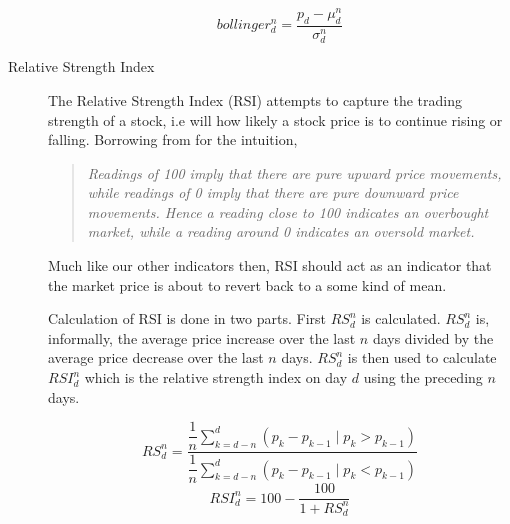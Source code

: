 \documentclass{report}
\begin{document}
\begin{description}
  \begin{figure}[H]
  \begin{center}
      \begin{equation}
        bollinger^{n}_{d} = \dfrac{p_{d} - \mu^{n}_{d}} {\sigma^{n}_{d}}
        \label{eq:bol-calc}
      \end{equation}
  \end{center}
  \end{figure}  
  
  \item[Relative Strength Index] 
  The Relative Strength Index (RSI) attempts to capture the trading strength of a stock, i.e will how likely a stock price is to continue rising or falling. Borrowing from \citet{wong2003rewarding} for the intuition,
  
  \begin{quotation}
  \textit{Readings of 100 imply that there are pure upward price movements, while readings of 0 imply that there are pure downward price movements. Hence a reading close to 100 indicates an overbought market, while a reading around 0 indicates an oversold market.}
  \end{quotation} 
  
  Much like our other indicators then, RSI should act as an indicator that the market price is about to revert back to a some kind of mean.
  
  Calculation of RSI is done in two parts. First $RS^{n}_{d}$ is calculated. $RS^{n}_{d}$ is, informally, the average price increase over the last $n$ days divided by the average price decrease over the last $n$ days. $RS^{n}_{d}$ is then used to calculate $RSI^{n}_{d}$ which is the relative strength index on day $d$ using the preceding $n$ days.
  
  \begin{figure}[H]
  \begin{center}
      \begin{equation}
        RS^{n}_{d} = \dfrac 
        {\dfrac {1} {n} \sum\limits_{k=d-n}^{d} ( p_{k} - p_{k-1} \mid p_{k} > p_{k-1})} 
        {\dfrac {1} {n} \sum\limits_{k=d-n}^{d} ( p_{k} - p_{k-1} \mid p_{k} < p_{k-1})}  
        \label{eq:rsi-calc}
      \end{equation}
      \begin{equation}
        RSI^{n}_{d} = 100 - \dfrac{100} {1 + RS^{n}_{d}} 
      \end{equation}  
  \end{center}
  \end{figure}  
  
\end{description}
\end{document}
